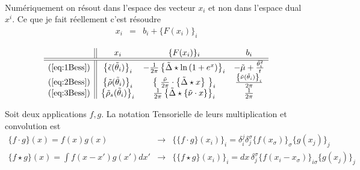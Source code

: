 {~}\\

Numériquement on résout dans l'espace des vecteur $x_i$ et non dans l'espace dual $x^i$. Ce que je fait réellement c'est résoudre 
\begin{eqnarray}
	x_i  & = & b_i  + \{F(x_i) \}_i  	
\end{eqnarray}

$$
\begin{array}{c||ccc}
	& x_i & \{F(x_i) \}_i & b_i \\
	\hline\hline
	(\ref{eq:1Bess}) & \left \{\tilde{\epsilon}(\tilde{\theta}_i) \right \}_i  & -\frac{1}{2 \pi} \left \{\tilde{\Delta} \star \ln \left ( 1 + e^{x } \right )  \right \}_i  & - \tilde{\mu} + \frac{\tilde{\theta}_i^2 }{t}	\\
	(\ref{eq:2Bess}) & \left \{\tilde{\rho}(\tilde{\theta}_i) \right \}_i  &  \left  \{ \frac{\tilde{\nu}}{2 \pi} \cdot \left \{\tilde{\Delta} \star x \right  \} \right \}_i & \frac{\left \{\tilde{\nu}(\tilde{\theta}_i) \right \}_i}{2 \pi} \\
	(\ref{eq:3Bess}) &  \left \{\tilde{\rho}_s(\tilde{\theta}_i) \right \}_i & \frac{1}{2 \pi} \left \{\tilde{\Delta} \star \{\tilde{\nu} \cdot  x\} \right \}_i & \frac{1}{2 \pi} 
\end{array}\\
$$

Soit deux applications $f , g $. La notation Tensorielle de leurs multiplication et convolution est 
\begin{eqnarray}
	\{f \cdot   g \} ( x ) = f(x)  g(x) & \rightarrow & \{ \{ f \cdot g \}( x_i )\}_i   = \delta^j_i \delta^\sigma_j \{f ( x_\sigma ) \}_\sigma \{g(x_j ) \}_j    \\
	\{f \star  g \} ( x ) = {\textstyle \int f ( x - x' ) g ( x' )  d x '}  & \rightarrow &	 \{\{ f \star g  \}(x_i)\}_i  = dx \, \delta^\sigma_j \{  f ( x_i -x_\sigma  )\}_{i\sigma }    \{g ( x_j)\}_j    
\end{eqnarray}


